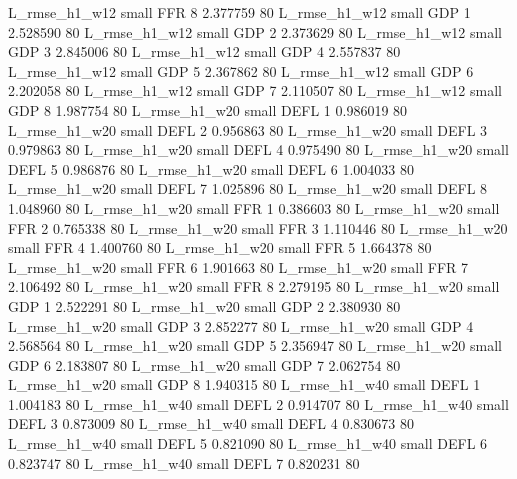  L_rmse_h1_w12      small      FFR                 8 2.377759 80
 L_rmse_h1_w12      small      GDP                 1 2.528590 80
 L_rmse_h1_w12      small      GDP                 2 2.373629 80
 L_rmse_h1_w12      small      GDP                 3 2.845006 80
 L_rmse_h1_w12      small      GDP                 4 2.557837 80
 L_rmse_h1_w12      small      GDP                 5 2.367862 80
 L_rmse_h1_w12      small      GDP                 6 2.202058 80
 L_rmse_h1_w12      small      GDP                 7 2.110507 80
 L_rmse_h1_w12      small      GDP                 8 1.987754 80
 L_rmse_h1_w20      small     DEFL                 1 0.986019 80
 L_rmse_h1_w20      small     DEFL                 2 0.956863 80
 L_rmse_h1_w20      small     DEFL                 3 0.979863 80
 L_rmse_h1_w20      small     DEFL                 4 0.975490 80
 L_rmse_h1_w20      small     DEFL                 5 0.986876 80
 L_rmse_h1_w20      small     DEFL                 6 1.004033 80
 L_rmse_h1_w20      small     DEFL                 7 1.025896 80
 L_rmse_h1_w20      small     DEFL                 8 1.048960 80
 L_rmse_h1_w20      small      FFR                 1 0.386603 80
 L_rmse_h1_w20      small      FFR                 2 0.765338 80
 L_rmse_h1_w20      small      FFR                 3 1.110446 80
 L_rmse_h1_w20      small      FFR                 4 1.400760 80
 L_rmse_h1_w20      small      FFR                 5 1.664378 80
 L_rmse_h1_w20      small      FFR                 6 1.901663 80
 L_rmse_h1_w20      small      FFR                 7 2.106492 80
 L_rmse_h1_w20      small      FFR                 8 2.279195 80
 L_rmse_h1_w20      small      GDP                 1 2.522291 80
 L_rmse_h1_w20      small      GDP                 2 2.380930 80
 L_rmse_h1_w20      small      GDP                 3 2.852277 80
 L_rmse_h1_w20      small      GDP                 4 2.568564 80
 L_rmse_h1_w20      small      GDP                 5 2.356947 80
 L_rmse_h1_w20      small      GDP                 6 2.183807 80
 L_rmse_h1_w20      small      GDP                 7 2.062754 80
 L_rmse_h1_w20      small      GDP                 8 1.940315 80
 L_rmse_h1_w40      small     DEFL                 1 1.004183 80
 L_rmse_h1_w40      small     DEFL                 2 0.914707 80
 L_rmse_h1_w40      small     DEFL                 3 0.873009 80
 L_rmse_h1_w40      small     DEFL                 4 0.830673 80
 L_rmse_h1_w40      small     DEFL                 5 0.821090 80
 L_rmse_h1_w40      small     DEFL                 6 0.823747 80
 L_rmse_h1_w40      small     DEFL                 7 0.820231 80
